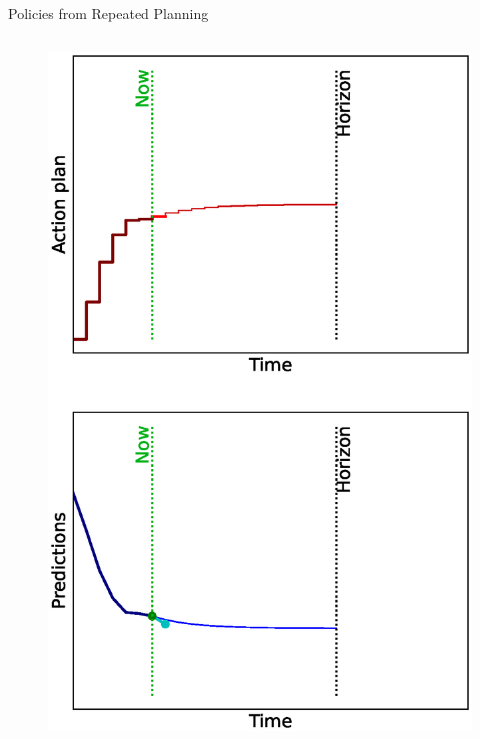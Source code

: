 \documentclass[lecture]{beamer}
\begin{document}
\begin{frame}{\normalsize Policies from Repeated Planning}
\begin{columns}
\begin{overlayarea}{\textwidth}{0.9\textheight}
\begin{figure}
{         \includegraphics[width=\FS\textwidth,clip]{Codes/MPC/MPC6.eps}
        }%
        {%
}
\end{figure}
\end{overlayarea}
\end{columns}
\end{frame}
\end{document}
